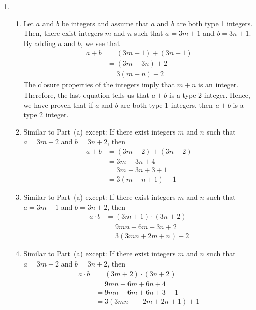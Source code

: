 \begin{enumerate}
\item \begin{enumerate} 
\item Let $a$ and $b$ be integers and assume that $a$ and $b$ are both type 1 integers.  Then, there exist integers $m$ and $n$ such that $a = 3m + 1$ and $b = 3n + 1$.  By adding $a$ and 
$b$, we see that
\[
\begin{aligned}
a + b &= \left( 3m + 1 \right) + \left( 3n + 1 \right) \\
      &= \left( 3m + 3n \right) + 2 \\
      &= 3 \left( m + n \right) + 2
\end{aligned}
\]
The closure properties of the integers imply that $m + n$ is an integer.  Therefore, the last equation tells us that $a + b$ is a type 2 integer.  Hence, we have proven that if $a$ and $b$ are both type 1 integers, then $a + b$ is a type 2 integer.

\item Similar to Part~(a) except:   If there exist integers $m$ and $n$ such that $a = 3m + 2$ and $b = 3n + 2$, then
\[
\begin{aligned}
a + b &= \left( 3m + 2 \right) + \left( 3n + 2 \right) \\
      &= 3m + 3n + 4 \\
      &= 3m + 3n + 3 + 1 \\
      &= 3 \left( m + n + 1 \right) + 1
\end{aligned}
\]

\item Similar to Part~(a) except:   If there exist integers $m$ and $n$ such that $a = 3m + 1$ and $b = 3n + 2$, then
\[
\begin{aligned}
a \cdot b &= \left( 3m + 1 \right) \cdot \left( 3n + 2 \right) \\
      &= 9mn + 6m + 3n + 2 \\
      &= 3 \left( 3mn + 2m + n \right) + 2
\end{aligned}
\]

\item Similar to Part~(a) except:   If there exist integers $m$ and $n$ such that $a = 3m + 2$ and $b = 3n + 2$, then
\[
\begin{aligned}
a \cdot b &= \left( 3m + 2 \right) \cdot \left( 3n + 2 \right) \\
      &= 9mn + 6m + 6n + 4 \\
      &= 9mn + 6m + 6n + 3 + 1 \\
      &= 3 \left( 3mn + + 2m + 2n + 1 \right) + 1
\end{aligned}
\]
\end{enumerate}



\end{enumerate}
